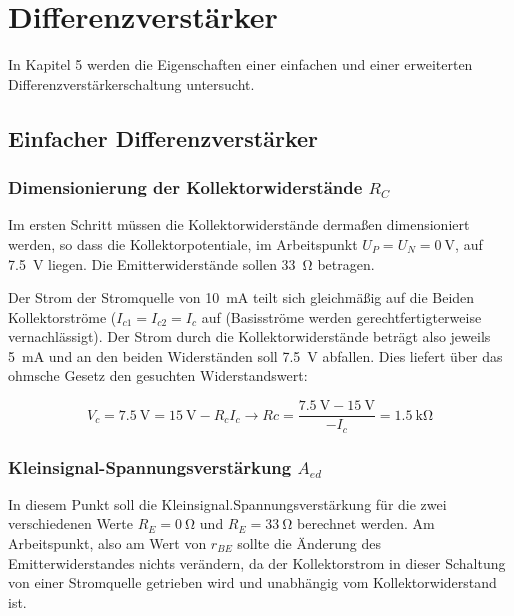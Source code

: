 \def\figpath{tex/5_Differenzverstaerker/pictures}
\graphicspath{{tex/5_Differenzverstaerker/pictures/}}

\chapter{Differenzverstärker}
In Kapitel 5 werden die Eigenschaften einer einfachen und einer erweiterten Differenzverstärkerschaltung untersucht.

\section{Einfacher Differenzverstärker}

\subsection{Dimensionierung der Kollektorwiderstände $R_C$}

Im ersten Schritt müssen die Kollektorwiderstände dermaßen dimensioniert werden, so dass die Kollektorpotentiale, im Arbeitspunkt $U_P = U_N = \SI{0}{\volt}$, auf \SI{7.5}{\volt} liegen. Die Emitterwiderstände sollen \SI{33}{\ohm} betragen.

Der Strom der Stromquelle von \SI{10}{\milli \ampere} teilt sich gleichmäßig auf die Beiden Kollektorströme ($I_{c1} = I_{c2} = I_c$ auf (Basisströme werden gerechtfertigterweise vernachlässigt). Der Strom durch die Kollektorwiderstände beträgt also jeweils \SI{5}{\milli \ampere} und an den beiden Widerständen soll \SI{7.5}{\volt} abfallen. Dies liefert über das ohmsche Gesetz den gesuchten Widerstandswert:

\begin{equation}
    V_c = \SI{7.5}{\volt} = \SI{15}{\volt} - R_c I_c \rightarrow Rc = \frac{\SI{7.5}{\volt} - \SI{15}{\volt}}{- I_c} = \SI{1.5}{\kilo \ohm}
\end{equation}

\subsection{Kleinsignal-Spannungsverstärkung $A_{ed}$}

In diesem Punkt soll die Kleinsignal.Spannungsverstärkung für die zwei verschiedenen Werte $R_E = \SI{0}{\ohm}$ und $R_E = \SI{33}{\ohm}$ berechnet werden. Am Arbeitspunkt, also am Wert von $r_{BE}$ sollte die Änderung des Emitterwiderstandes nichts verändern, da der Kollektorstrom in dieser Schaltung von einer Stromquelle getrieben wird und unabhängig vom Kollektorwiderstand ist.

